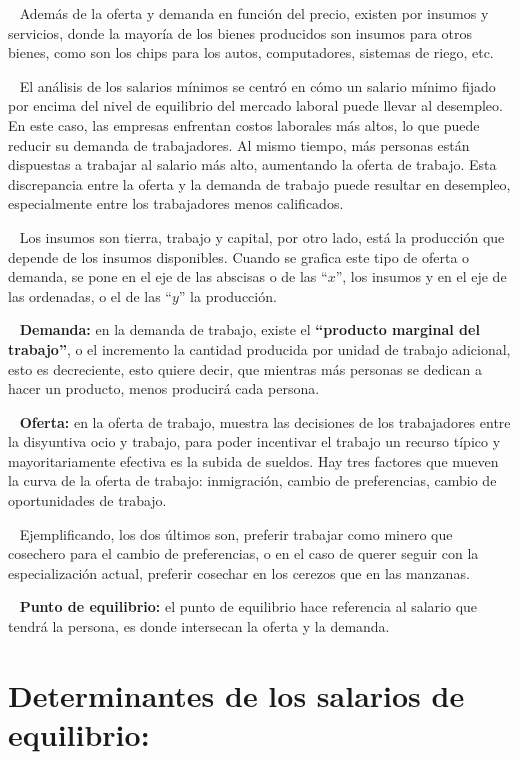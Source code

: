 \documentclass[
  letterpaper,
  DIV=11,
  numbers=noendperiod]{scrreport}
\begin{document}
~ Además de la oferta y demanda en función del precio, existen por
insumos y servicios, donde la mayoría de los bienes producidos son
insumos para otros bienes, como son los chips para los autos,
computadores, sistemas de riego, etc.

~ El análisis de los salarios mínimos se centró en cómo un salario
mínimo fijado por encima del nivel de equilibrio del mercado laboral
puede llevar al desempleo. En este caso, las empresas enfrentan costos
laborales más altos, lo que puede reducir su demanda de trabajadores. Al
mismo tiempo, más personas están dispuestas a trabajar al salario más
alto, aumentando la oferta de trabajo. Esta discrepancia entre la oferta
y la demanda de trabajo puede resultar en desempleo, especialmente entre
los trabajadores menos calificados.

~ Los insumos son tierra, trabajo y capital, por otro lado, está la
producción que depende de los insumos disponibles. Cuando se grafica
este tipo de oferta o demanda, se pone en el eje de las abscisas o de
las ``\(x\)'', los insumos y en el eje de las ordenadas, o el de las
``\(y\)'' la producción.

~ \textbf{Demanda:} en la demanda de trabajo, existe el
\textbf{``producto marginal del trabajo''}, o el incremento la cantidad
producida por unidad de trabajo adicional, esto es decreciente, esto
quiere decir, que mientras más personas se dedican a hacer un producto,
menos producirá cada persona.

~ \textbf{Oferta:} en la oferta de trabajo, muestra las decisiones de
los trabajadores entre la disyuntiva ocio y trabajo, para poder
incentivar el trabajo un recurso típico y mayoritariamente efectiva es
la subida de sueldos. Hay tres factores que mueven la curva de la oferta
de trabajo: inmigración, cambio de preferencias, cambio de oportunidades
de trabajo.

~ Ejemplificando, los dos últimos son, preferir trabajar como minero que
cosechero para el cambio de preferencias, o en el caso de querer seguir
con la especialización actual, preferir cosechar en los cerezos que en
las manzanas.

~ \textbf{Punto de equilibrio:} el punto de equilibrio hace referencia
al salario que tendrá la persona, es donde intersecan la oferta y la
demanda.

\hypertarget{determinantes-de-los-salarios-de-equilibrio}{%
\section{Determinantes de los salarios de
equilibrio:}\label{determinantes-de-los-salarios-de-equilibrio}}
\end{document}
